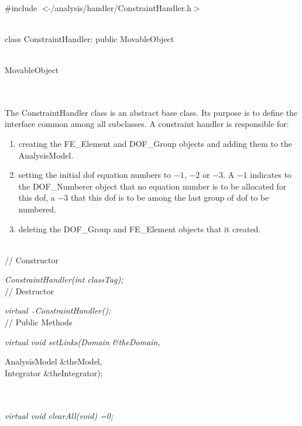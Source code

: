 
   \\
\#include $<\tilde{ }$/analysis/handler/ConstraintHandler.h$>$  


  \\
class ConstraintHandler: public MovableObject  


 \\
MovableObject 

\indent{} \\

 \\ 
\indent The ConstraintHandler class is an abstract base class. Its purpose is
to define the interface common among all subclasses.  A constraint
handler is responsible for: \begin{enumerate} \item creating the
FE\_Element and DOF\_Group objects and adding them to the
AnalysisModel. \item setting the initial dof equation numbers to $-1$,
$-2$ or $-3$. A $-1$ indicates to the DOF\_Numberer object that no
equation number is to be allocated for this dof, a $-3$ that this dof
is to be among the last group of dof to be numbered. \item deleting
the DOF\_Group and FE\_Element objects that it created.\end{enumerate}


 \\
// Constructor 

{\em ConstraintHandler(int classTag);}\\  

// Destructor 

{\em virtual~ $\tilde{}$ConstraintHandler();}\\  

// Public Methods

{\em virtual void setLinks(Domain \&theDomain, 

\indent\indent\indent\indent AnalysisModel \&theModel, \\
\indent\indent\indent\indent Integrator \&theIntegrator);} \\
 \\ 
{\em virtual void clearAll(void) =0;} \\ 

